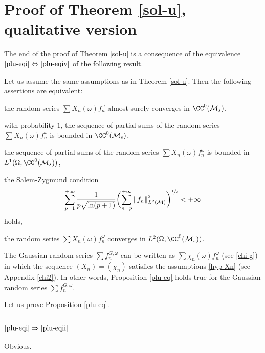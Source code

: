 \section{Proof of Theorem \ref{sol-u}, qualitative version}\label{sec-marc2}

The end of the proof of Theorem \ref{sol-u} is a consequence of the equivalence $\eqref{plu-eqi}\Leftrightarrow\eqref{plu-eqiv}$ of the following result.

\begin{prop}\label{plu-eq}
Let us assume the same assumptions as in Theorem \ref{sol-u}. Then the following assertions are equivalent:
\begin{enumeratei}
\item\label{plu-eqi} the random series $\sum X_n(\omega) f_n^{\omega}$ almost surely converges in $\CC^0(\mathcal{M}_s)$,
\item\label{plu-eqii} with probability $1$, the sequence of partial sums of the random series $\sum X_n(\omega) f_n^{\omega}$ is bounded in $\CC^0(\mathcal{M}_s)$,
\item\label{plu-eqiii} the sequence of partial sums of the random series $\sum X_n(\omega) f_n^{\omega}$ is bounded in $L^1(\Omega,\CC^0(\mathcal{M}_s))$,
\item\label{plu-eqiv} the Salem-Zygmund condition
\[
\sum_{p=1}^{+\infty} \frac{1}{p\sqrt{\ln(p+1)}}\biggl(\sum_{n=p}^{+\infty} \left\Vert f_n\right\Vert_{L^2(\mathcal{M})}^2 \biggr)^{\sfrac{1}{2}}<+\infty
\]
holds,
\item\label{plu-eqv} the random series $\sum X_n(\omega) f_n^\omega$ converges in $L^2(\Omega,\CC^0(\mathcal{M}_s))$.
\end{enumeratei}
\end{prop}

\begin{rema} The Gaussian random series $\sum f_n^{G,\omega}$ can be written as $\sum \chi_n(\omega) f_n^{\omega}$ (see \eqref{chi-g}) in which the sequence $(X_n)=(\chi_n)$ satisfies the assumptions \eqref{hyp-Xn} (see Appendix \ref{chi2}). In other words, Proposition \ref{plu-eq} holds true for the Gaussian random series $\sum f_n^{G,\omega}$.
\end{rema}

Let us prove Proposition \ref{plu-eq}.

\subsubsection*{$\eqref{plu-eqi}\Rightarrow\eqref{plu-eqii}$}
Obvious.

